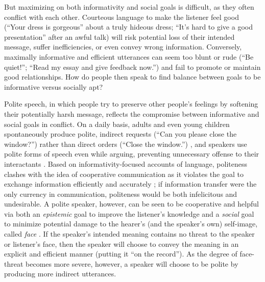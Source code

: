 \documentclass[12pt]{article}
\begin{document}
But maximizing on both informativity and social goals is difficult, as they often conflict with each other. 
Courteous language to make the listener feel good (\enquote{Your dress is gorgeous} about a truly hideous dress; \enquote{It's hard to give a good presentation} after an awful talk) will risk potential loss of their intended message, suffer inefficiencies, or even convey wrong information. 
Conversely, maximally informative and efficient utterances can seem too blunt or rude (\enquote{Be quiet!}; \enquote{Read my essay and give feedback now.}) and fail to promote or maintain good relationships.
How do people then speak to find balance between goals to be informative versus socially apt?

Polite speech, in which people try to preserve other people's feelings by softening their potentially harsh message, 
reflects the compromise between informative and social goals in conflict.
On a daily basis,
adults and even young children spontaneously produce polite, indirect requests (``Can you please close the window?'') rather than direct orders (``Close the window.'') \cite{clark1980, axia1985}, 
and speakers use polite forms of speech even while arguing, preventing unnecessary offense to their interactants \cite{holtgraves1997}. 
Based on informativity-focused accounts of language, politeness clashes with the idea of cooperative communication as it violates the goal to exchange information efficiently and accurately \cite{grice1975};
if information transfer were the only currency in communication, politeness would be both infelicitous and undesirable.  
A polite speaker, however, can be seen to be cooperative and helpful via both an \emph{epistemic} goal to improve the listener's knowledge and a \emph{social} goal to minimize potential damage to the hearer's (and the speaker's own) self-image, called \emph{face} \cite{brown1987}. 
If the speaker's intended meaning contains no threat to the speaker or listener's face, then the speaker will choose to convey the meaning in an explicit and efficient manner (putting it \enquote{on the record}). 
As the degree of face-threat becomes more severe, however, a speaker will choose to be polite by producing more indirect utterances. 
\end{document}
